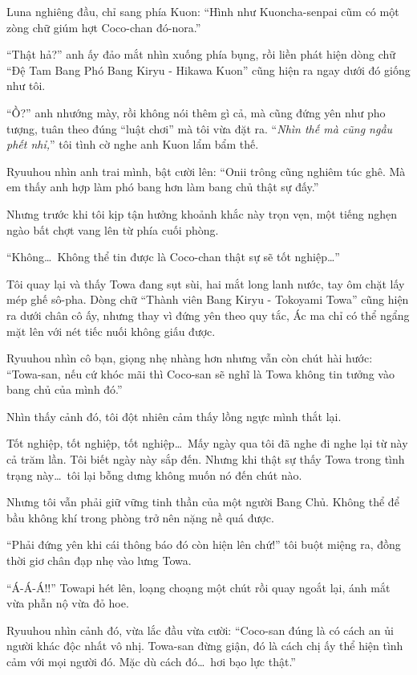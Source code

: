 \documentclass[../main.tex]{subfiles}
\begin{document}
Luna nghiêng đầu, chỉ sang phía Kuon: ``Hình như Kuoncha-senpai cũm có một zòng chữ giúm hợt Coco-chan đó-nora.''

``Thật hả?'' anh ấy đảo mắt nhìn xuống phía bụng, rồi liền phát hiện dòng chữ ``Đệ Tam Bang Phó Bang Kiryu - Hikawa Kuon'' cũng hiện ra ngay dưới đó giống như tôi.

``Ồ?'' anh nhướng mày, rồi không nói thêm gì cả, mà cũng đứng yên như pho tượng, tuân theo đúng ``luật chơi'' mà tôi vừa đặt ra. ``\textit{Nhìn thế mà cũng ngầu phết nhỉ,}'' tôi tình cờ nghe anh Kuon lẩm bẩm thế.

Ryuuhou nhìn anh trai mình, bật cười lên: ``Onii trông cũng nghiêm túc ghê. Mà em thấy anh hợp làm phó bang hơn làm bang chủ thật sự đấy.''

Nhưng trước khi tôi kịp tận hưởng khoảnh khắc này trọn vẹn, một tiếng nghẹn ngào bất chợt vang lên từ phía cuối phòng.

``Không\dots\ Không thể tin được là Coco-chan thật sự sẽ tốt nghiệp\dots''

Tôi quay lại và thấy Towa đang sụt sùi, hai mắt long lanh nước, tay ôm chặt lấy mép ghế sô-pha. Dòng chữ ``Thành viên Bang Kiryu - Tokoyami Towa'' cũng hiện ra dưới chân cô ấy, nhưng thay vì đứng yên theo quy tắc, Ác ma chỉ có thể ngẩng mặt lên với nét tiếc nuối không giấu được.


Ryuuhou nhìn cô bạn, giọng nhẹ nhàng hơn nhưng vẫn còn chút hài hước: ``Towa-san, nếu cứ khóc mãi thì Coco-san sẽ nghĩ là Towa không tin tưởng vào bang chủ của mình đó.''

Nhìn thấy cảnh đó, tôi đột nhiên cảm thấy lồng ngực mình thắt lại.

Tốt nghiệp, tốt nghiệp, tốt nghiệp\dots\ Mấy ngày qua tôi đã nghe đi nghe lại từ này cả trăm lần. Tôi biết ngày này sắp đến. Nhưng khi thật sự thấy Towa trong tình trạng này\dots\ tôi lại bỗng dưng không muốn nó đến chút nào.

Nhưng tôi vẫn phải giữ vững tinh thần của một người Bang Chủ. Không thể để bầu không khí trong phòng trở nên nặng nề quá được.

``Phải đứng yên khi cái thông báo đó còn hiện lên chứ!'' tôi buột miệng ra, đồng thời giơ chân đạp nhẹ vào lưng Towa.

``Á-Á-Á!!'' Towapi hét lên, loạng choạng một chút rồi quay ngoắt lại, ánh mắt vừa phẫn nộ vừa đỏ hoe.

Ryuuhou nhìn cảnh đó, vừa lắc đầu vừa cười: ``Coco-san đúng là có cách an ủi người khác độc nhất vô nhị. Towa-san đừng giận, đó là cách chị ấy thể hiện tình cảm với mọi người đó. Mặc dù cách đó\dots\ hơi bạo lực thật.''
\end{document}
